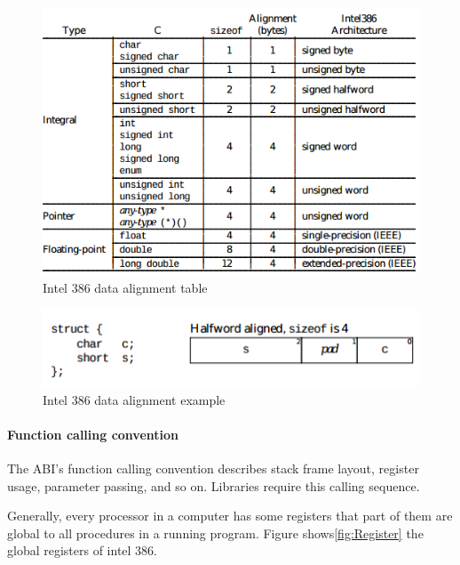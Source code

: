               \begin{figure}
                \centering
                \includegraphics[scale = 0.5]
                {Images/concepts/DataAlign.png}
                \caption[Intel 386 data alignment table]%
                {Intel 386 data alignment table\cite{SCO-386}}    
                \label{fig:DataAlign}
              \end{figure}
              
              
              \begin{figure}
                \centering
                \includegraphics[scale = 0.6]
                {Images/concepts/DataAlign1.png}
                \caption[Intel 386 data alignment example]%
                {Intel 386 data alignment example\cite{SCO-386}}    
                \label{fig:DataAlign1}
              \end{figure}
            
            
        \paragraph{Function calling convention}
        The ABI's function calling convention describes stack frame layout, register usage, parameter passing, and so on. Libraries require this calling sequence\cite{SCO-386}.
        
        Generally, every processor in a computer has some registers that part of them are global to all procedures in a running program. Figure shows\ref{fig:Register} the global registers of intel 386.
        
